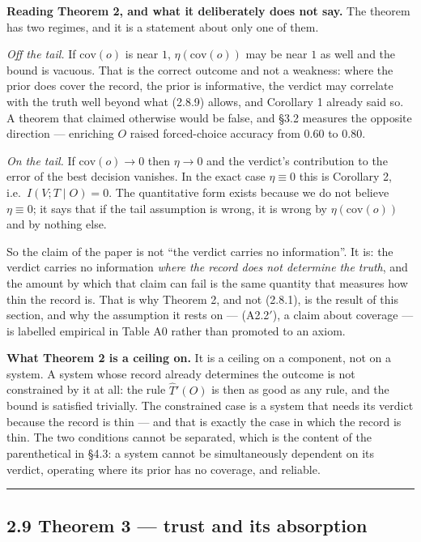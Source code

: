 \documentclass[11pt,a4paper]{article}
\begin{document}
\textbf{Reading Theorem 2, and what it deliberately does not say.} The theorem has two
regimes, and it is a statement about only one of them.

\emph{Off the tail.} If \(\mathrm{cov}(o)\) is near \(1\), \(\eta(\mathrm{cov}(o))\) may be
near \(1\) as well and the bound is vacuous. That is the correct outcome and not a
weakness: where the prior does cover the record, the prior is informative, the
verdict may correlate with the truth well beyond what (2.8.9) allows, and
Corollary 1 already said so. A theorem that claimed otherwise would be false, and
§3.2 measures the opposite direction --- enriching \(O\) raised forced-choice accuracy
from \(0.60\) to \(0.80\).

\emph{On the tail.} If \(\mathrm{cov}(o)\to0\) then \(\eta\to0\) and the verdict's
contribution to the error of the best decision vanishes. In the exact case
\(\eta\equiv0\) this is Corollary 2, i.e.~\(I(V;T\mid O)=0\). The quantitative form
exists because we do not believe \(\eta\equiv0\); it says that if the tail assumption
is wrong, it is wrong by \(\eta(\mathrm{cov}(o))\) and by nothing else.

So the claim of the paper is not ``the verdict carries no information''. It is: the
verdict carries no information \emph{where the record does not determine the truth}, and
the amount by which that claim can fail is the same quantity that measures how thin
the record is. That is why Theorem 2, and not (2.8.1), is the result of this
section, and why the assumption it rests on --- (A2.2\('\)), a claim about coverage ---
is labelled empirical in Table A0 rather than promoted to an axiom.

\textbf{What Theorem 2 is a ceiling on.} It is a ceiling on a component, not on a
system. A system whose record already determines the outcome is not constrained by
it at all: the rule \(\hat T'(O)\) is then as good as any rule, and the bound is
satisfied trivially. The constrained case is a system that needs its verdict
because the record is thin --- and that is exactly the case in which the record is
thin. The two conditions cannot be separated, which is the content of the
parenthetical in §4.3: a system cannot be simultaneously dependent on its verdict,
operating where its prior has no coverage, and reliable.

\begin{center}\rule{0.5\linewidth}{0.5pt}\end{center}

\subsection{2.9 Theorem 3 --- trust and its absorption}\label{theorem-3-trust-and-its-absorption}
\end{document}
